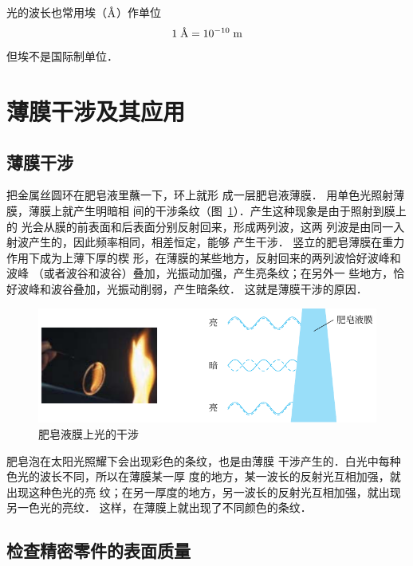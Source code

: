 光的波长也常用埃（$\text{\AA}$）作单位
\[1\;\text{\AA}=10^{-10} \;\text{m} \]
但埃不是国际制单位．

\section{薄膜干涉及其应用}
\subsection{薄膜干涉}
把金属丝圆环在肥皂液里蘸一下，环上就形
成一层肥皂液薄膜．
用单色光照射薄膜，薄膜上就产生明暗相
间的干涉条纹（图~\ref{fig_C_6-4}）．产生这种现象是由于照射到膜上的
光会从膜的前表面和后表面分别反射回来，形成两列波，这两
列波是由同一入射波产生的，因此频率相同，相差恒定，能够
产生干涉．
竖立的肥皂薄膜在重力作用下成为上薄下厚的楔
形，在薄膜的某些地方，反射回来的两列波恰好波峰和波峰
（或者波谷和波谷）叠加，光振动加强，产生亮条纹；在另外一
些地方，恰好波峰和波谷叠加，光振动削弱，产生暗条纹．
这就是薄膜干涉的原因．
\begin{figure}[htbp]
    \centering
    \includegraphics{fig/C/6-4.pdf}
    \caption{肥皂液膜上光的干涉}\label{fig_C_6-4}
\end{figure}


肥皂泡在太阳光照耀下会出现彩色的条纹，也是由薄膜
干涉产生的．白光中每种色光的波长不同，所以在薄膜某一厚
度的地方，某一波长的反射光互相加强，就出现这种色光的亮
纹；在另一厚度的地方，另一波长的反射光互相加强，就出现
另一色光的亮纹．
这样，在薄膜上就出现了不同颜色的条纹．

\subsection{检查精密零件的表面质量}


